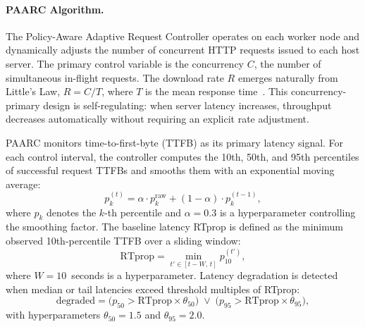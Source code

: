 \documentclass[11pt, letterpaper]{article}
\begin{document}
\paragraph{PAARC Algorithm.}
The Policy-Aware Adaptive Request Controller operates on each worker node and
dynamically adjusts the number of concurrent HTTP requests issued to each host
server. The primary control variable is the concurrency $C$, the number of
simultaneous in-flight requests. The download rate
$R$ emerges naturally from Little's Law, $R = C / T$, where $T$ is the mean
response time~\cite{deng2025flowdc}. This concurrency-primary design is
self-regulating: when server latency increases, throughput decreases
automatically without requiring an explicit rate adjustment.

PAARC monitors time-to-first-byte (TTFB) as its primary latency signal. For
each control interval, the controller computes the 10th, 50th, and 95th
percentiles of successful request TTFBs and smooths them with an exponential
moving average:
%
\begin{equation}
\label{eq:ema}
p_k^{(t)} = \alpha \cdot p_k^{\mathrm{raw}}
           + (1 - \alpha) \cdot p_k^{(t-1)},
\end{equation}
%
where $p_k$ denotes the $k$-th percentile and $\alpha=0.3$ is a hyperparameter controlling the smoothing
factor. The baseline latency RTprop is defined as the minimum observed
10th-percentile TTFB over a sliding window:
%
\begin{equation}
\label{eq:rtprop}
\mathrm{RTprop} = \min_{t' \in [t - W,\, t]} p_{10}^{(t')},
\end{equation}
%
where $W = 10$~seconds is a hyperparameter. Latency degradation is detected when median or tail
latencies exceed threshold multiples of RTprop:
%
\begin{equation}
\label{eq:degradation}
\mathrm{degraded} = \bigl(p_{50} > \mathrm{RTprop} \times \theta_{50}\bigr)
  \;\lor\;
  \bigl(p_{95} > \mathrm{RTprop} \times \theta_{95}\bigr),
\end{equation}
%
with hyperparameters $\theta_{50} = 1.5$ and $\theta_{95} = 2.0$.
\end{document}

